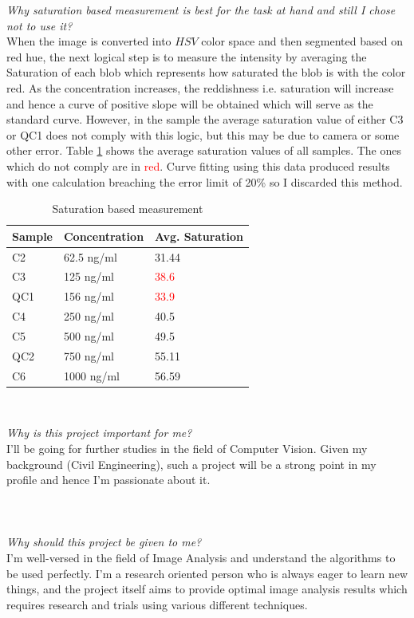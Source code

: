 \documentclass[runningheads,a4paper]{llncs}
\begin{document}
\emph{Why saturation based measurement is best for the task at hand and still I chose not to use it?}\\
When the image is converted into $HSV$ color space and then segmented based on red hue, the next logical step is to measure the intensity by averaging the Saturation of each blob which represents how saturated the blob is with the color red. As the concentration increases, the reddishness i.e. saturation will increase and hence a curve of positive slope will be obtained which will serve as the standard curve. However, in the sample the average saturation value of either C3 or QC1 does not comply with this logic, but this may be due to camera or some other error. Table \ref{table:hsvsat} shows the average saturation values of all samples. The ones which do not comply are in \textcolor{red}{red}. Curve fitting using this data produced results with one calculation breaching the error limit of 20\% so I discarded this method.
\\

\begin{table}
\begin{center}
\setlength\tabcolsep{2.5pt}
\def\arraystretch{1.5}
\begin{tabular}{| m{7em} m{9em} m{9em}|}
\hline
Sample & Concentration & Avg. Saturation\\
\hline
\hline
C2 & 62.5 ng/ml & 31.44\\
\hline
C3 & 125 ng/ml & \textcolor{red}{38.6}\\
\hline
QC1 & 156 ng/ml & \textcolor{red}{33.9}\\
\hline
C4 & 250 ng/ml & 40.5\\
\hline
C5 & 500 ng/ml & 49.5\\
\hline
QC2 & 750 ng/ml & 55.11\\
\hline
C6 & 1000 ng/ml & 56.59\\
\hline

\hline
\end{tabular}
\\
\caption{Saturation based measurement}
\label{table:hsvsat}
\end{center}
\end{table}
\emph{Why is this project important for me?}\\
I'll be going for further studies in the field of Computer Vision. Given my background (Civil Engineering), such a project will be a strong point in my profile and hence I'm passionate about it.\\ \\
\\ \\
\emph{Why should this project be given to me?}\\ 
I'm well-versed in the field of Image Analysis and understand the algorithms to be used perfectly. I'm a research oriented person who is always eager to learn new things, and the project itself aims to provide optimal image analysis results which requires research and trials using various different techniques. 
\end{document}
